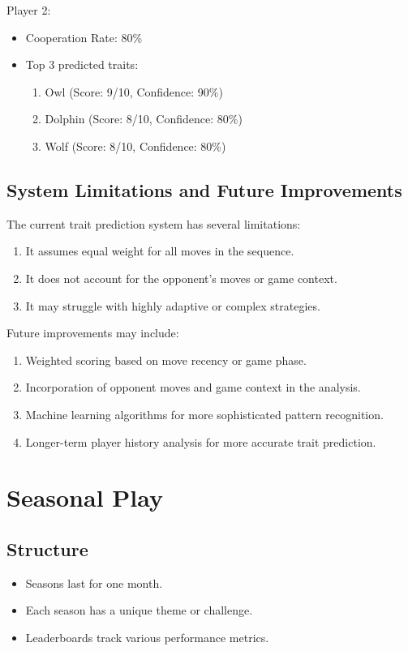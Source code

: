 \documentclass[]{article}
\begin{document}
Player 2:
\begin{itemize}
\item Cooperation Rate: 80\%
\item Top 3 predicted traits:
  \begin{enumerate}
  \item Owl (Score: 9/10, Confidence: 90\%)
  \item Dolphin (Score: 8/10, Confidence: 80\%)
  \item Wolf (Score: 8/10, Confidence: 80\%)
  \end{enumerate}
\end{itemize}

\subsection{System Limitations and Future Improvements}

The current trait prediction system has several limitations:
\begin{enumerate}
\item It assumes equal weight for all moves in the sequence.
\item It does not account for the opponent's moves or game context.
\item It may struggle with highly adaptive or complex strategies.
\end{enumerate}

Future improvements may include:
\begin{enumerate}
\item Weighted scoring based on move recency or game phase.
\item Incorporation of opponent moves and game context in the analysis.
\item Machine learning algorithms for more sophisticated pattern recognition.
\item Longer-term player history analysis for more accurate trait prediction.
\end{enumerate}

\section{Seasonal Play}

\subsection{Structure}

\begin{itemize}
\item Seasons last for one month.
\item Each season has a unique theme or challenge.
\item Leaderboards track various performance metrics.
\end{itemize}
\end{document}
